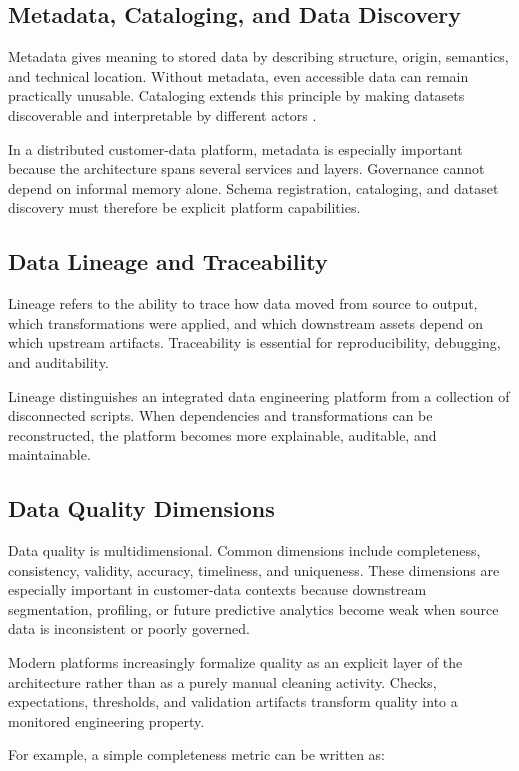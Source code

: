 \subsection{Metadata, Cataloging, and Data Discovery}
Metadata gives meaning to stored data by describing structure, origin, semantics, and technical location. Without metadata, even accessible data can remain practically unusable. Cataloging extends this principle by making datasets discoverable and interpretable by different actors \cite{kleppmann2017ddia}.

In a distributed customer-data platform, metadata is especially important because the architecture spans several services and layers. Governance cannot depend on informal memory alone. Schema registration, cataloging, and dataset discovery must therefore be explicit platform capabilities.

\subsection{Data Lineage and Traceability}
Lineage refers to the ability to trace how data moved from source to output, which transformations were applied, and which downstream assets depend on which upstream artifacts. Traceability is essential for reproducibility, debugging, and auditability.

Lineage distinguishes an integrated data engineering platform from a collection of disconnected scripts. When dependencies and transformations can be reconstructed, the platform becomes more explainable, auditable, and maintainable.

\subsection{Data Quality Dimensions}
Data quality is multidimensional. Common dimensions include completeness, consistency, validity, accuracy, timeliness, and uniqueness. These dimensions are especially important in customer-data contexts because downstream segmentation, profiling, or future predictive analytics become weak when source data is inconsistent or poorly governed.

Modern platforms increasingly formalize quality as an explicit layer of the architecture rather than as a purely manual cleaning activity. Checks, expectations, thresholds, and validation artifacts transform quality into a monitored engineering property.

For example, a simple completeness metric can be written as:

